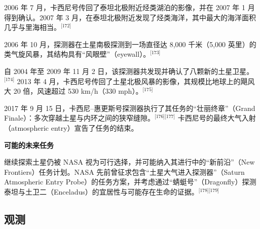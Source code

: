 2006 年 7 月，卡西尼号传回了泰坦北极附近烃类湖泊的影像，并在 2007 年 1 月得到确认。2007 年 3 月，在泰坦北极附近发现了烃类海洋，其中最大的海洋面积几乎与里海相当。\(^\text{[172]}\)

2006 年 10 月，探测器在土星南极探测到一场直径达 8,000 千米（5,000 英里）的类气旋风暴，其结构具有“风眼壁”（eyewall）。\(^\text{[173]}\)

自 2004 年至 2009 年 11 月 2 日，该探测器共发现并确认了八颗新的土星卫星。\(^\text{[174]}\) 2013 年 4 月，卡西尼号传回了土星北极风暴的影像，其规模比地球上的飓风大 20 倍，风速超过 530 km/h（330 mph）。\(^\text{[175]}\)

2017 年 9 月 15 日，卡西尼–惠更斯号探测器执行了其任务的“壮丽终章”（Grand Finale）：多次穿越土星与内环之间的狭窄缝隙。\(^\text{[176][177]}\) 卡西尼号的最终大气入射（atmospheric entry）宣告了任务的结束。

\textbf{可能的未来任务}

继续探索土星仍被 NASA 视为可行选择，并可能纳入其进行中的“新前沿”（New Frontiers）任务计划。NASA 先前曾征求包含“土星大气进入探测器”（Saturn Atmospheric Entry Probe）的任务方案，并考虑通过“蜻蜓号”（Dragonfly）探测泰坦与土卫二（Enceladus）的宜居性与可能存在生命的证据。\(^\text{[178][179]}\)
\subsection{观测}















